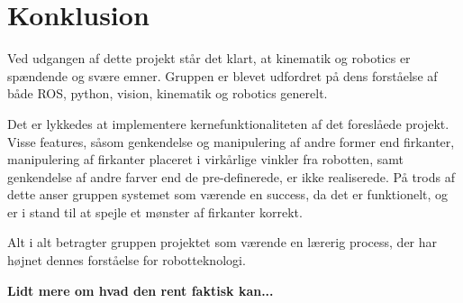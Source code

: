 \chapter{Konklusion}\label{chap:Konklusion}
Ved udgangen af dette projekt står det klart, at kinematik og robotics er spændende og svære emner.
Gruppen er blevet udfordret på dens forståelse af både ROS, python, vision, kinematik og robotics generelt. 

Det er lykkedes at implementere kernefunktionaliteten af det foreslåede projekt.
Visse features, såsom genkendelse og manipulering af andre former end firkanter, manipulering af firkanter placeret i virkårlige vinkler fra robotten, samt genkendelse af andre farver end de pre-definerede, er ikke realiserede.
På trods af dette anser gruppen systemet som værende en success, da det er funktionelt, og er i stand til at spejle et mønster af firkanter korrekt.  

Alt i alt betragter gruppen projektet som værende en lærerig process, der har højnet dennes forståelse for robotteknologi.

\textbf{Lidt mere om hvad den rent faktisk kan...}
